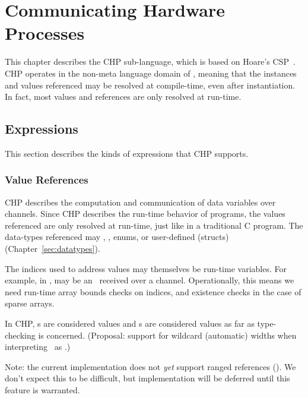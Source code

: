 

\chapter{Communicating Hardware Processes}
\label{sec:chp}

This chapter describes the CHP sub-language, which is based on
Hoare's CSP~\cite{ref:csp}.  
CHP operates in the non-meta language domain of \hac, 
meaning that the instances and values referenced may be
resolved at compile-time, even after instantiation.  
In fact, most values and references are only resolved at run-time.  


\section{Expressions}
\label{sec:chp:expr}

This section describes the kinds of expressions that CHP supports.  

\subsection{Value References}
\label{sec:chp:expr:values}

CHP describes the computation and communication of data variables
over channels.  
Since CHP describes the run-time behavior of programs, 
the values referenced are only resolved at run-time, 
just like in a traditional C program.  
The data-types referenced may \bool, \int, enums, or user-defined (structs)
(Chapter~\ref{sec:datatypes}).  

The indices used to address values may themselves be run-time variables.  
For example, in ,  may be an \int\ received over a channel.  
Operationally, this means we need run-time array bounds checks on indices, 
and existence checks in the case of sparse arrays.  

In CHP, \pint s are considered \int{} values and
\pbool s are considered \bool values as far as type-checking is concerned.  
(Proposal: support for wildcard (automatic) widths when interpreting
\pint\ as \int.)  

Note: the current implementation does not \emph{yet} support ranged
references (). 
We don't expect this to be difficult, but implementation will be deferred
until this feature is warranted.  

